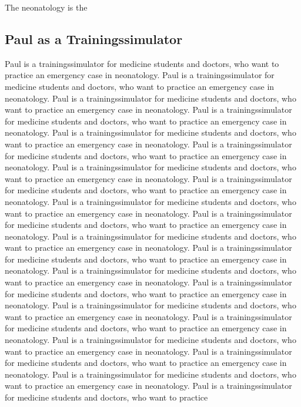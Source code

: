 \documentclass[12pt]{article}
\begin{document}
The neonatology is the


\subsection{Paul as a Trainingssimulator}

Paul is a trainingssimulator for medicine students and doctors, who want to practice
an emergency case in neonatology. Paul is a trainingssimulator for medicine students and doctors, who want to practice
an emergency case in neonatology. Paul is a trainingssimulator for medicine students and doctors, who want to practice
an emergency case in neonatology. Paul is a trainingssimulator for medicine students and doctors, who want to practice
an emergency case in neonatology. Paul is a trainingssimulator for medicine students and doctors, who want to practice
an emergency case in neonatology. Paul is a trainingssimulator for medicine students and doctors, who want to practice
an emergency case in neonatology. Paul is a trainingssimulator for medicine students and doctors, who want to practice
an emergency case in neonatology. Paul is a trainingssimulator for medicine students and doctors, who want to practice
an emergency case in neonatology. Paul is a trainingssimulator for medicine students and doctors, who want to practice
an emergency case in neonatology. Paul is a trainingssimulator for medicine students and doctors, who want to practice
an emergency case in neonatology. Paul is a trainingssimulator for medicine students and doctors, who want to practice
an emergency case in neonatology. Paul is a trainingssimulator for medicine students and doctors, who want to practice
an emergency case in neonatology. Paul is a trainingssimulator for medicine students and doctors, who want to practice
an emergency case in neonatology. Paul is a trainingssimulator for medicine students and doctors, who want to practice
an emergency case in neonatology. Paul is a trainingssimulator for medicine students and doctors, who want to practice
an emergency case in neonatology. Paul is a trainingssimulator for medicine students and doctors, who want to practice
an emergency case in neonatology. Paul is a trainingssimulator for medicine students and doctors, who want to practice
an emergency case in neonatology. Paul is a trainingssimulator for medicine students and doctors, who want to practice
an emergency case in neonatology. Paul is a trainingssimulator for medicine students and doctors, who want to practice
an emergency case in neonatology. Paul is a trainingssimulator for medicine students and doctors, who want to practice
\end{document}
